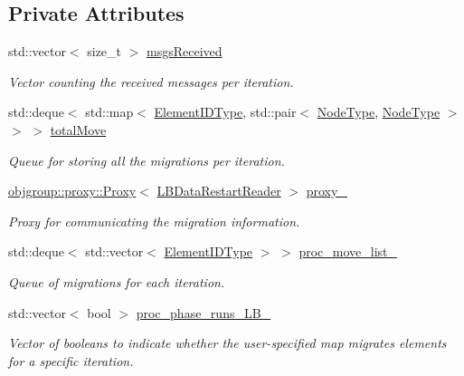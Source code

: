 \subsection*{Private Attributes}
\begin{DoxyCompactItemize}
\item 
std\+::vector$<$ size\+\_\+t $>$ \hyperlink{structvt_1_1vrt_1_1collection_1_1balance_1_1_l_b_data_restart_reader_a6701886537453e5e053141c70de6df05}{msgs\+Received}
\begin{DoxyCompactList}\small\item\em Vector counting the received messages per iteration. \end{DoxyCompactList}\item 
std\+::deque$<$ std\+::map$<$ \hyperlink{namespacevt_1_1vrt_1_1collection_1_1balance_a592736f733df4f90856df90a1fd08905}{Element\+I\+D\+Type}, std\+::pair$<$ \hyperlink{namespacevt_a866da9d0efc19c0a1ce79e9e492f47e2}{Node\+Type}, \hyperlink{namespacevt_a866da9d0efc19c0a1ce79e9e492f47e2}{Node\+Type} $>$ $>$ $>$ \hyperlink{structvt_1_1vrt_1_1collection_1_1balance_1_1_l_b_data_restart_reader_a76edba85d36553f53aeaea7440cb24ad}{total\+Move}
\begin{DoxyCompactList}\small\item\em Queue for storing all the migrations per iteration. \end{DoxyCompactList}\item 
\hyperlink{structvt_1_1objgroup_1_1proxy_1_1_proxy}{objgroup\+::proxy\+::\+Proxy}$<$ \hyperlink{structvt_1_1vrt_1_1collection_1_1balance_1_1_l_b_data_restart_reader}{L\+B\+Data\+Restart\+Reader} $>$ \hyperlink{structvt_1_1vrt_1_1collection_1_1balance_1_1_l_b_data_restart_reader_a65b1a0379efca529b3ce6cff045e047a}{proxy\+\_\+}
\begin{DoxyCompactList}\small\item\em Proxy for communicating the migration information. \end{DoxyCompactList}\item 
std\+::deque$<$ std\+::vector$<$ \hyperlink{namespacevt_1_1vrt_1_1collection_1_1balance_a592736f733df4f90856df90a1fd08905}{Element\+I\+D\+Type} $>$ $>$ \hyperlink{structvt_1_1vrt_1_1collection_1_1balance_1_1_l_b_data_restart_reader_aff7cb0b695a7542cf35ae43ff38d2742}{proc\+\_\+move\+\_\+list\+\_\+}
\begin{DoxyCompactList}\small\item\em Queue of migrations for each iteration. \end{DoxyCompactList}\item 
std\+::vector$<$ bool $>$ \hyperlink{structvt_1_1vrt_1_1collection_1_1balance_1_1_l_b_data_restart_reader_a18ca212a0944044b3de577042e2f7be0}{proc\+\_\+phase\+\_\+runs\+\_\+\+L\+B\+\_\+}
\begin{DoxyCompactList}\small\item\em Vector of booleans to indicate whether the user-\/specified map migrates elements for a specific iteration. \end{DoxyCompactList}\end{DoxyCompactItemize}
